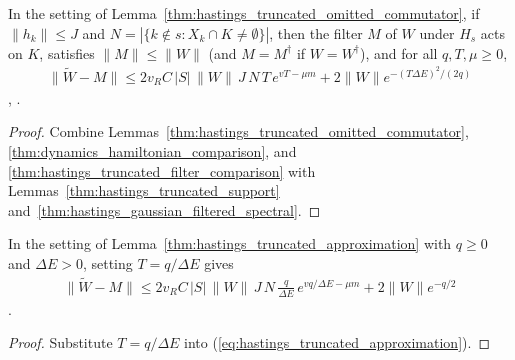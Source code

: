 \begin{lemma}
    \label{thm:hastings_truncated_approximation}
    \leanok
    In the setting of Lemma~\ref{thm:hastings_truncated_omitted_commutator},
    if $\|h_k\|\le J$ and $N=|\{k\notin s:X_k\cap K\ne\emptyset\}|$, then the
    filter $M$ of $W$ under $H_s$ acts on $K$, satisfies $\|M\|\le\|W\|$ (and
    $M=M^\dagger$ if $W=W^\dagger$), and for all $q,T,\mu\ge0$,
    \begin{align}
        \|\widetilde W-M\|\le2v_RC\,|S|\,\|W\|\,J\,N\,T\,e^{vT-\mu m}
        +2\|W\|e^{-(T\Delta E)^2/(2q)}
        \label{eq:hastings_truncated_approximation}
    \end{align}
    \cite[eq.~(apb), lines 300--320]{Hastings2006Solving},
    \cite{gap:hastings05_truncated_dynamics}.
\end{lemma}
\begin{proof}
    \leanok
    Combine Lemmas~\ref{thm:hastings_truncated_omitted_commutator},
    \ref{thm:dynamics_hamiltonian_comparison}, and
    \ref{thm:hastings_truncated_filter_comparison} with
    Lemmas~\ref{thm:hastings_truncated_support}
    and~\ref{thm:hastings_gaussian_filtered_spectral}.
\end{proof}

\begin{lemma}[The truncated approximation at the time window $T=q/\Delta E$]
    \label{thm:hastings_truncated_approximation_time}
    \leanok
    In the setting of Lemma~\ref{thm:hastings_truncated_approximation} with
    $q\ge0$ and $\Delta E>0$, setting $T=q/\Delta E$ gives
    \begin{align}
        \|\widetilde W-M\|\le2v_RC\,|S|\,\|W\|\,J\,N\,\frac{q}{\Delta E}\,
        e^{vq/\Delta E-\mu m}+2\|W\|e^{-q/2}
        \label{eq:hastings_truncated_approximation_time}
    \end{align}
    \cite[lines 337--349]{Hastings2006Solving}.
\end{lemma}
\begin{proof}
    \leanok
    Substitute $T=q/\Delta E$ into (\ref{eq:hastings_truncated_approximation}).
\end{proof}

